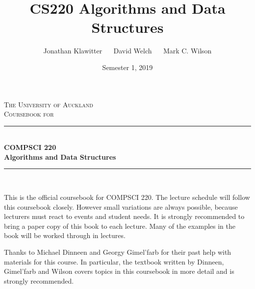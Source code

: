 \documentclass[11pt,oneside]{memoir}
\theoremstyle{definition}
\numberwithin{Lemma}{chapter}
\numberwithin{Exercise}{section}
\theoremstyle{remark}
\begin{document}
   


\title{CS220 Algorithms and Data Structures}
\author{Jonathan Klawitter $\quad$ David Welch $\quad$ Mark C. Wilson}
\date{Semester 1, 2019}

\begin{titlingpage}
\newcommand{\HRule}{\rule{\linewidth}{0.5mm}}
\setlength{\droptitle}{30pt} 
\begin{adjustwidth*}{1cm}{-2cm}
\centering

\vspace*{0.4cm}
\textsc{\LARGE The University of Auckland}\\[3cm]

\textsc{\Large Coursebook for}\\[0.4cm]

\HRule\\[0.5cm]
\Huge{\bfseries COMPSCI 220\\ 
Algorithms and Data Structures}\\[0.1cm]
\HRule\\[0.5cm]
\Large{\thedate}

\vspace*{2.4cm}
\LARGE{\theauthor}

\end{adjustwidth*}
\end{titlingpage}



\setcounter{page}{1}

\tableofcontents




{}

\thispagestyle{empty}
This is the official coursebook for COMPSCI 220. The lecture schedule will follow this coursebook closely. However small variations are always possible, because lecturers must react to events and student needs. It is strongly recommended to bring a paper copy of this book to each lecture. Many of the examples in the book will be worked through in lectures.

Thanks to Michael Dinneen and Georgy Gimel'farb for their past help with materials for this course. In particular, the textbook written by Dinneen, Gimel'farb and Wilson covers topics in this coursebook in more detail and is strongly recommended.
\end{document}
